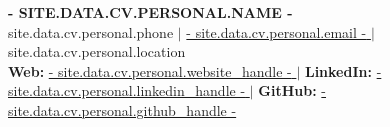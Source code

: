 \documentclass[10pt,letterpaper]{article}
\begin{document}
{\centering
    {\fontsize{16}{18}\selectfont\textbf{\MakeUppercase{ {{- site.data.cv.personal.name -}} }}} \\[2pt]
    {\small {{ site.data.cv.personal.phone }} $|$ \href{mailto:{{ site.data.cv.personal.email }}}{ {{- site.data.cv.personal.email -}} } $|$ {{ site.data.cv.personal.location }}} \\[1pt]
    {\small \textbf{Web:} \href{ {{- site.data.cv.personal.website -}} }{ {{- site.data.cv.personal.website_handle -}} } $|$
    \textbf{LinkedIn:} \href{ {{- site.data.cv.personal.linkedin -}} }{ {{- site.data.cv.personal.linkedin_handle -}} } $|$
    \textbf{GitHub:} \href{ {{- site.data.cv.personal.github -}} }{ {{- site.data.cv.personal.github_handle -}} }}\par
}
\vspace{4pt}
\end{document}
